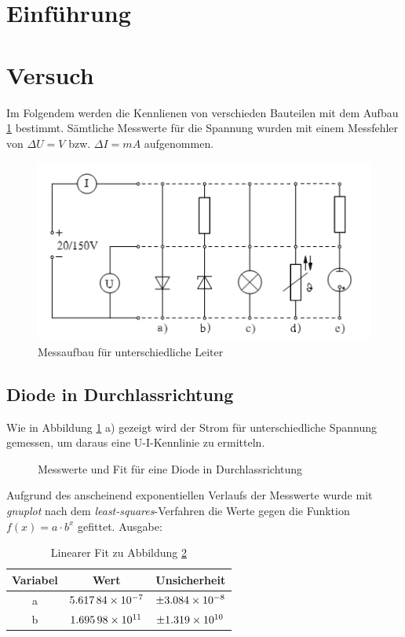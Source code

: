\section{Einführung}
\section{Versuch}
Im Folgendem werden die Kennlienen von verschieden Bauteilen mit dem Aufbau \ref{fig:aufbau} bestimmt. Sämtliche Messwerte für die Spannung wurden mit einem Messfehler von $\Delta U = V$ bzw. $\Delta I = mA$ aufgenommen.
\begin{figure}[H]
	\centering
	\includegraphics[width=.8\textwidth]{Aufbau.png}
	\caption{Messaufbau für unterschiedliche Leiter}
	\label{fig:aufbau}
\end{figure}
\subsection{Diode in Durchlassrichtung}
Wie in Abbildung \ref{fig:aufbau} a) gezeigt wird der Strom für unterschiedliche Spannung gemessen, um daraus eine U-I-Kennlinie zu ermitteln.

\begin{figure}[H]
\centering
{}
\caption{Messwerte und Fit für eine Diode in Durchlassrichtung}
\label{fig:diode}
\end{figure}
Aufgrund des anscheinend exponentiellen Verlaufs der Messwerte wurde mit \emph{gnuplot} nach dem \emph{least-squares}-Verfahren die Werte gegen die Funktion $f(x)=a\cdot b^x$ gefittet. Ausgabe:
\begin{table}[H]
  \centering
  \begin{tabular}{c | c | c }
    Variabel   & Wert & Unsicherheit\\ \hline
    a & $\num{5.61784d-7}$ & $\pm\num{3.084d-8}$ \\
    b & $\num{1.69598d+11}$ & $\pm\num{1.319d+10}$
  \end{tabular}
  \caption{Linearer Fit zu Abbildung \ref{fig:diode}}
  \label{tab:fitdiode}
\end{table}
